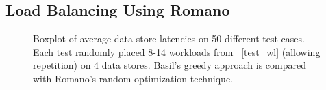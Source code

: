 \subsection{Load Balancing Using Romano}
\begin{figure}
\centering
{}
\caption{Boxplot of average data store latencies on 50 different test cases.
Each test randomly placed 8-14 workloads from \tablename~\ref{test_wl} (allowing repetition) on 4 data stores.
Basil's greedy approach is compared with Romano's random optimization technique.
}
\label{load_bal}
\end{figure}

